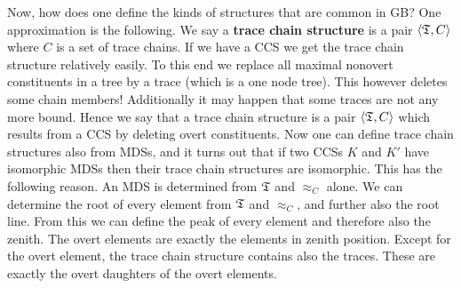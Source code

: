 Now, how does one define the kinds of structures that are common in
GB? One approximation is the following. We say a \textbf{trace chain
structure} 
is a pair $\langle \mathfrak{T}, C\rangle$ where $C$ is a set of trace
chains. If we have a CCS we get the trace chain structure
relatively easily. To this end we replace all maximal nonovert
constituents in a tree by a trace (which is a one node tree). This
however deletes some chain members! Additionally it may happen
that some traces are not any more bound. Hence we say that a trace
chain structure is a pair $\langle \mathfrak{T}, C\rangle$ which results from a
CCS by deleting overt constituents. Now one can define trace chain
structures also from MDSs, and it turns out that if two CCSs $K$
and $K'$ have isomorphic MDSs then their trace chain structures
are isomorphic. This has the following reason. An MDS is
determined from $\mathfrak{T}$ and $\approx_C$ alone. We can determine the
root of every element from $\mathfrak{T}$ and $\approx_C$, and further also
the root line. From this we can define the peak of every element
and therefore also the zenith. The overt elements are exactly the
elements in zenith position. Except for the overt element, the trace 
chain structure contains also the traces. These are exactly
the overt daughters of the overt elements.

